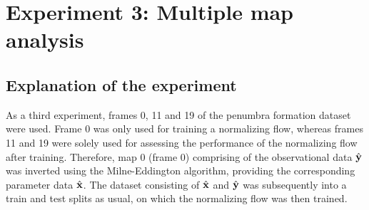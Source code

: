 \documentclass[a4paper,12pt]{report}
\def\lk#1{{\color{black}{#1}}}
\begin{document}

\FloatBarrier

\section{Experiment 3: Multiple map analysis}
\subsection{Explanation of the experiment}\label{sec:explanation_experiment_3}
As a third experiment, frames 0, 11 and 19 of the penumbra formation dataset were used. Frame 0 was only used for training a normalizing flow, whereas frames 11 and 19 were solely used for assessing the performance of the normalizing flow after training. Therefore, map 0 (frame 0) comprising of the observational data $\hat{\boldsymbol{\mathbf{y}}}$ was inverted using the Milne-Eddington algorithm, providing the corresponding parameter data $\hat{\boldsymbol{\mathbf{x}}}$. The dataset consisting of $\hat{\boldsymbol{\mathbf{x}}}$ and $\hat{\boldsymbol{\mathbf{y}}}$ was subsequently \lk{split} into a train and test splits as usual, on which the normalizing flow was then trained.
\end{document}
